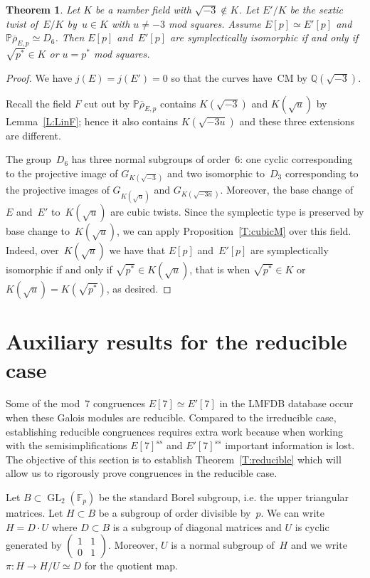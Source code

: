 \documentclass[12pt, reqno]{amsart}
\newcommand{\F}{\mathbb{F}}
\newcommand{\PP}{\mathbb{P}}
\newcommand{\Q}{\mathbb{Q}}
\newcommand{\rhobar}{{\overline{\rho}}}
\newcommand{\GL}{\operatorname{GL}}
\numberwithin{equation}{section}
\newtheorem{theorem}{Theorem}[section]
\theoremstyle{definition}
\theoremstyle{remark}
\begin{document}
\begin{theorem}\label{T:sexticM} 
Let $K$ be a number field with $\sqrt{-3} \not\in K$. 
Let $E'/K$ be the sextic twist of~$E/K$ by~$u \in K$ with $u \neq -3$ mod squares. 
Assume $E[p] \simeq E'[p]$
and $\PP \rhobar_{E,p} \simeq D_6$.
Then $E[p]$ and~$E'[p]$ are symplectically isomorphic if and only if
$\sqrt{p^*} \in K$ or $u = p^*$ mod squares.
\end{theorem}
\begin{proof}   
We have $j(E)=j(E')=0$ so that the curves have~CM by $\Q(\sqrt{-3})$. 

Recall the field $F$ cut out by $\PP \rhobar_{E,p}$ 
contains $K(\sqrt{-3})$ 
and $K(\sqrt{u})$ by Lemma~\ref{L:LinF}; 
hence it also contains $K(\sqrt{-3u})$ and these three extensions are different.


The group~$D_6$ has three normal subgroups of order~$6$: one cyclic corresponding to the projective image of $G_{K(\sqrt{-3})}$ and two isomorphic to~$D_3$ corresponding to the projective images of
$G_{K(\sqrt{u})}$ and $G_{K(\sqrt{-3u})}$.
Moreover, the base change of~$E$ and~$E'$ 
to~$K(\sqrt{u})$ are cubic twists. Since the 
symplectic type is preserved by base change 
to~$K(\sqrt{u})$, we can apply Proposition~\ref{T:cubicM} over this field.
Indeed, over~$K(\sqrt{u})$ we have that $E[p]$ and~$E'[p]$ are symplectically isomorphic if and only if
$\sqrt{p^*} \in K(\sqrt{u})$, that is when
$\sqrt{p^*} \in K$ or $K(\sqrt{u}) = K(\sqrt{p^*})$, as desired.
\end{proof}


\section{Auxiliary results for the reducible case}

Some of the mod~$7$ congruences 
$E[7] \simeq E'[7]$ in the LMFDB database occur 
when these Galois modules are reducible. Compared to the irreducible case, establishing reducible congruences requires extra work because when working with the semisimplifications $E[7]^{ss}$ and $E'[7]^{ss}$ important information is lost.
The objective of this section is to establish Theorem~\ref{T:reducible} which will allow us to rigorously prove congruences in the reducible case.


Let $B \subset \GL_2(\F_p)$ be the standard Borel subgroup, i.e. the
upper triangular matrices. Let $H \subset B$ be a subgroup of order
divisible by~$p$.  We can write~$H = D\cdot U$ where $D \subset B$ is
a subgroup of diagonal matrices and $U$ is cyclic generated by
$\left(\begin{smallmatrix} 1 & 1 \\ 0 & 1
                            \end{smallmatrix} \right)$.   
Moreover, $U$ is a normal subgroup of~$H$ 
and we write $\pi : H \to H/U \simeq D$ for the quotient map.
\end{document}
